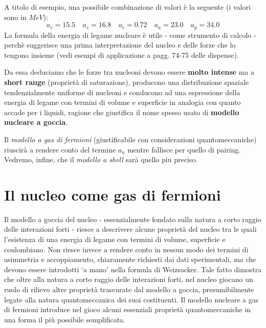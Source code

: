 A titolo di esempio, una possibile combinazione di valori è la seguente (i
valori sono in \(MeV\)):
\begin{equation}
	a_{v} = 15.5 \quad a_{s} = 16.8 \quad a_{c} = 0.72 \quad a_{a} = 23.0 \quad a_{p} = 34.0
	\label{eq:typical-values-drop-model}
\end{equation}
La formula della energia di legame nucleare è utile - come strumento di
calcolo - perchè suggerisce una prima interpretazione del nucleo e delle
forze che lo tengono insieme (vedi esempi di applicazione a pagg. 74-75 delle dispense).

Da essa deduciamo che le forze tra nucleoni devono essere \textbf{molto
	intense} ma a \textbf{short range} (proprietà di saturazione), producono
una distribuzione spaziale tendenzialmente uniforme di nucleoni e
conducono ad una espressione della energia di legame con termini di
volume e superficie in analogia con quanto accade per i liquidi, ragione
che giustifica il nome spesso usato di \textbf{modello nucleare a
	goccia}.

Il \emph{modello a gas di fermioni} (giustificabile con considerazioni
quantomeccaniche) riuscirà a rendere conto del termine \(a_{a}\) mentre
fallisce per quello di pairing.
Vedremo, infine, che il \emph{modello a shell} sarà quello piu preciso.

\section{Il nucleo come gas di fermioni}\label{sec:il-nucleo-come-gas-di-fermioni}



Il modello a goccia del nucleo - essenzialmente fondato sulla natura a corto raggio delle interazioni forti - riesce a descrivere alcune proprietà del nucleo tra le quali l’esistenza di una energia di legame con termini di volume, superficie e coulombiano.
Non riesce invece a rendere conto in nessun modo dei termini di asimmetria e accoppiamento, chiaramente richiesti dai dati sperimentali, ma che devono essere introdotti ‘a mano’ nella formula di Weizsacker.
Tale fatto dimostra che oltre alla natura a corto raggio delle interazioni forti, nel nucleo giocano un ruolo di rilievo altre proprietà trascurate dal modello a goccia, presumibilmente legate alla natura quantomeccanica dei suoi costituenti.
Il modello nucleare a gas di fermioni introduce nel gioco alcuni essenziali proprietà quantomeccaniche in una forma il più possibile semplificata.

